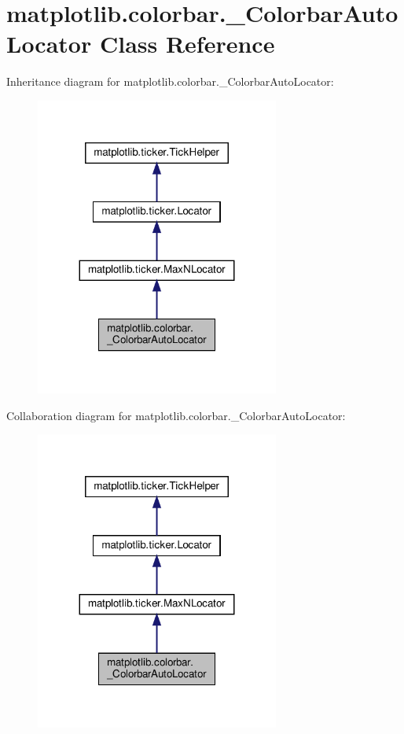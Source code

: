 \hypertarget{classmatplotlib_1_1colorbar_1_1__ColorbarAutoLocator}{}\section{matplotlib.\+colorbar.\+\_\+\+Colorbar\+Auto\+Locator Class Reference}
\label{classmatplotlib_1_1colorbar_1_1__ColorbarAutoLocator}


Inheritance diagram for matplotlib.\+colorbar.\+\_\+\+Colorbar\+Auto\+Locator\+:
\nopagebreak
\begin{figure}[H]
\begin{center}
\leavevmode
\includegraphics[width=227pt]{classmatplotlib_1_1colorbar_1_1__ColorbarAutoLocator__inherit__graph}
\end{center}
\end{figure}


Collaboration diagram for matplotlib.\+colorbar.\+\_\+\+Colorbar\+Auto\+Locator\+:
\nopagebreak
\begin{figure}[H]
\begin{center}
\leavevmode
\includegraphics[width=227pt]{classmatplotlib_1_1colorbar_1_1__ColorbarAutoLocator__coll__graph}
\end{center}
\end{figure}
